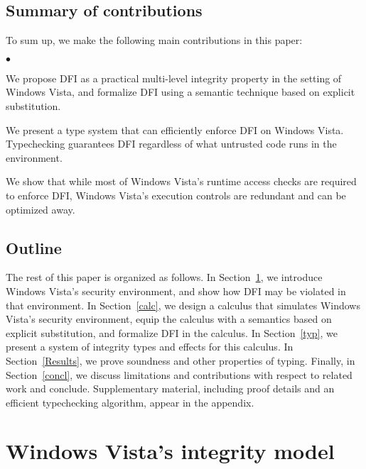 \documentclass{sigplanconf}
\newenvironment{compact}
        {\begin{list}{$\bullet$}{
}}
        {\end{list}}
\begin{document}
\subsection{Summary of contributions} To sum up, we make the following main contributions in this paper:\begin{compact}
\item
We propose DFI as a practical multi-level integrity property in the setting of Windows Vista, and formalize DFI using a semantic technique based on explicit substitution.
\item
We present a type system that can efficiently enforce DFI on Windows Vista. Typechecking guarantees DFI regardless 
of what untrusted code runs in the environment. \item
We show that while most of Windows Vista's runtime access checks are required to enforce DFI, Windows Vista's execution controls are redundant and can be optimized away.
\end{compact}

\subsection{Outline} The rest of this paper is organized as follows. 
In Section~\ref{overview},
we introduce Windows Vista's security environment, and show how DFI may be violated in that environment. 
In Section~\ref{calc}, we design a calculus that simulates Windows Vista's security environment, equip the calculus with a semantics based on explicit substitution, and formalize DFI in the calculus. 
In Section~\ref{typ}, we
present a system of integrity types and effects for this calculus.  In
Section~\ref{Results}, we prove soundness and other properties of typing. 
Finally, in Section~\ref{concl}, we
discuss limitations and contributions with respect to related work and
conclude. 
Supplementary material, including proof details and an efficient typechecking algorithm, appear in the appendix. 
















\section{Windows Vista's integrity model}\label{overview} 
\end{document}
